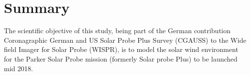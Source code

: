 
\section{Summary}
\label{sec:summary}
The scientific objective of this study, being part of the German contribution Coronagraphic German and US Solar Probe Plus Survey (CGAUSS) to the Wide field Imager for Solar Probe (WISPR), is to model the solar wind environment for the Parker Solar Probe mission (formerly Solar probe Plus) to be launched mid 2018.

